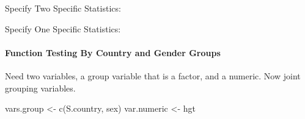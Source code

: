 \documentclass[
]{book}
\newenvironment{Shaded}{\begin{snugshade}}{\end{snugshade}}
\newcommand{\AttributeTok}[1]{\textcolor[rgb]{0.77,0.63,0.00}{#1}}
\newcommand{\FunctionTok}[1]{\textcolor[rgb]{0.00,0.00,0.00}{#1}}
\newcommand{\NormalTok}[1]{#1}
\newcommand{\OtherTok}[1]{\textcolor[rgb]{0.56,0.35,0.01}{#1}}
\newcommand{\SpecialCharTok}[1]{\textcolor[rgb]{0.00,0.00,0.00}{#1}}
\newcommand{\StringTok}[1]{\textcolor[rgb]{0.31,0.60,0.02}{#1}}
\begin{document}
Specify Two Specific Statistics:

\begin{Shaded}
\end{Shaded}

Specify One Specific Statistics:

\begin{Shaded}
\end{Shaded}

\hypertarget{function-testing-by-country-and-gender-groups}{%
\paragraph{Function Testing By Country and Gender Groups}\label{function-testing-by-country-and-gender-groups}}

Need two variables, a group variable that is a factor, and a numeric. Now joint grouping variables.

\begin{Shaded}
\begin{Highlighting}[]
\NormalTok{vars.group }\OtherTok{\textless{}{-}} \FunctionTok{c}\NormalTok{(}\StringTok{\textquotesingle{}S.country\textquotesingle{}}\NormalTok{, }\StringTok{\textquotesingle{}sex\textquotesingle{}}\NormalTok{)}
\NormalTok{var.numeric }\OtherTok{\textless{}{-}} \StringTok{\textquotesingle{}hgt\textquotesingle{}}
\end{Highlighting}
\end{Shaded}
\end{document}
